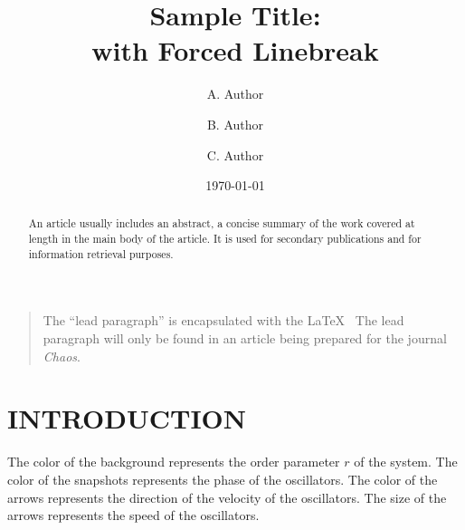 \documentclass[%
 aip,
 amsmath,amssymb,
 reprint,%
]{revtex4-1}
\begin{document}

\title[Sample title]{Sample Title:\\with Forced Linebreak}
\author{A. Author}
\author{B. Author}%
%

\author{C. Author}
%

\date{\today}%

\begin{abstract}
    An article usually includes an abstract, a concise summary of the work
    covered at length in the main body of the article. It is used for
    secondary publications and for information retrieval purposes. 
\end{abstract}

\maketitle

\begin{quotation}
    The ``lead paragraph'' is encapsulated with the \LaTeX\
    The lead paragraph will only be found in an article being prepared for the journal \textit{Chaos}.
\end{quotation}

\section{\label{sec:level1}INTRODUCTION\protect\\ }
The color of the background represents the order parameter $r$ of the system. The color of the snapshots represents the phase of the oscillators. The color of the arrows represents the direction of the velocity of the oscillators. The size of the arrows represents the speed of the oscillators. 
\end{document}

